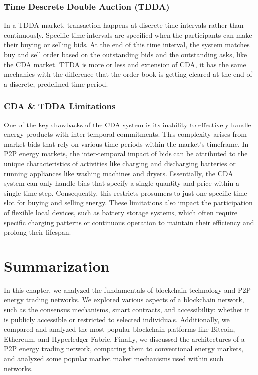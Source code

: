 \subsubsection*{Time Descrete Double Auction (TDDA)}

In a TDDA market, transaction happens at discrete time intervals rather than continuously. Specific time intervals are specified when the participants can make their buying or selling
bids. At the end of this time interval, the system matches buy and sell order based on the outstanding bids and the outstanding asks, like the CDA market. TTDA is more or less and
extension of CDA, it has the same mechanics with the difference that the order book is getting cleared at the end of a discrete, predefined time period. \cite{BrooklynMicrogrid}

\subsubsection*{CDA \& TDDA Limitations}
One of the key drawbacks of the CDA system is its inability to effectively handle energy products with inter-temporal commitments. This complexity arises from market bids that
rely on various time periods within the market's timeframe. In P2P energy markets, the inter-temporal impact of bids can be attributed to the unique characteristics of
activities like charging and discharging batteries or running appliances like washing machines and dryers. Essentially, the CDA system can only handle bids that specify a
single quantity and price within a single time step. Consequently, this restricts prosumers to just one specific time slot for buying and selling energy. These limitations also
impact the participation of flexible local devices, such as battery storage systems, which often require specific charging patterns or continuous operation to maintain their
efficiency and prolong their lifespan. \cite{DeTrade}

\section{Summarization}
In this chapter, we analyzed the fundamentals of blockchain technology and P2P energy trading networks. We explored various aspects of a blockchain network, such as the consensus mechanisms, 
smart contracts, and accessibility: whether it is publicly accessible or restricted to selected individuals. Additionally, we compared and analyzed the most popular blockchain platforms like 
Bitcoin, Ethereum, and Hyperledger Fabric. Finally, we discussed the architectures of a P2P energy trading network, comparing them to conventional energy markets, and analyzed some popular market 
maker mechanisms used within such networks.